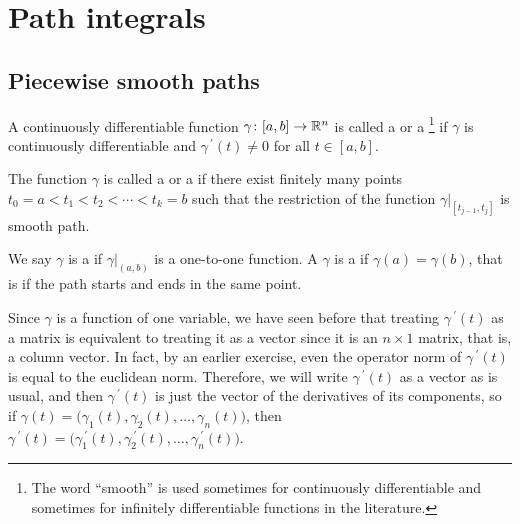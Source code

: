%
%
%
%
%



\sectionnewpage
\section{Path integrals}
\label{sec:pathintegral}


\subsection{Piecewise smooth paths}

\begin{defn}
A continuously differentiable function $\gamma \colon [a,b] \to {\mathbb{R}}^n$ is
called a \emph{}
or a
\emph{}\footnote{The
word ``smooth'' is used
sometimes for continuously differentiable and sometimes for infinitely
differentiable functions in the literature.}
if
$\gamma$ is continuously differentiable and
$\gamma^{\:\prime}(t) \not= 0$ for all $t \in [a,b]$.

The function $\gamma$ is called a
\emph{} or a
\emph{}
if there exist finitely many points
$t_0 = a < t_1 < t_2 < \cdots < t_k = b$ such that
the restriction of the function $\gamma|_{[t_{j-1},t_j]}$ is smooth path.

We say $\gamma$ is a \emph{} if $\gamma|_{(a,b)}$ is
a one-to-one function.  A $\gamma$ is 
a \emph{} if $\gamma(a) = \gamma(b)$, that is
if the path starts and ends in the same point.
\end{defn}

Since $\gamma$ is a function of one variable,
we have seen before that treating $\gamma^{\:\prime}(t)$ as a matrix is equivalent
to treating it as a vector since it is an $n \times 1$ matrix, that is,
a column vector.
In fact, by an earlier exercise, even the operator norm of
$\gamma^{\:\prime}(t)$ is equal to
the euclidean norm.  Therefore, we will write $\gamma^{\:\prime}(t)$ as a vector
as is usual, and then $\gamma^{\:\prime}(t)$ is just the vector of the derivatives
of its components, so if $\gamma(t) =
\bigl( \gamma_1(t), \gamma_2(t), \ldots, \gamma_n(t) \bigr)$, then
$\gamma^{\:\prime}(t) =
\bigl( \gamma_1^{\:\prime}(t), \gamma_2^{\:\prime}(t), \ldots,
\gamma_n^{\:\prime}(t) \bigr)$.


